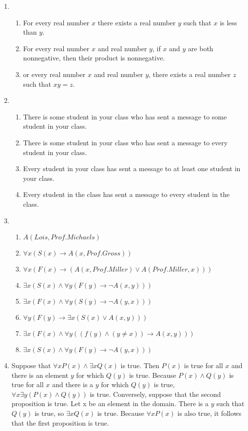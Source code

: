 \documentclass{../../cls/sig-alternate-05-2015}
\begin{document}
\begin{enumerate}
\item 
\begin{enumerate}
	\item For every real number $x$ there exists a real number $y$
	such that $x$ is less than $y$.
	\item For every real number $x$ and real
	number $y$, if $x$ and $y$ are both nonnegative, then their product
	is nonnegative.
	\item or every real number $x$ and real number
	$y$, there exists a real number $z$ such that $xy = z$.
\end{enumerate}

\item 
\begin{enumerate}
	\item There is some student in your class who has sent a message to
	some student in your class.
	\item There is some student in your
	class who has sent a message to every student in your class.
	\item Every student in your class has sent a message to at least
	one student in your class.
	\item Every student in the class
	has sent a message to every student in the class.
\end{enumerate}

\item 
\begin{enumerate}
	\item $A(Lois, Prof. Michaels)$
	\item $\forall x (S(x) \rightarrow A(x, Prof. Gross))$
	\item $\forall x (F(x) \rightarrow (A(x, Prof. Miller) \vee A(Prof. Miller, x)))$
	\item $\exists x (S(x) \wedge \forall y (F(y) \rightarrow \neg A(x, y)))$
	\item $\exists x (F(x) \wedge \forall y (S(y) \rightarrow \neg A(y, x)))$
	\item $\forall y (F(y) \rightarrow \exists x (S(x) \vee A(x, y)))$
	\item $\exists x (F(x) \wedge \forall y ((f(y) \wedge (y \ne x)) \rightarrow A(x, y)))$
	\item $\exists x (S(x) \wedge \forall y (F(y) \rightarrow \neg A(y, x)))$
\end{enumerate}
	
\item Suppose that $\forall x P(x) \wedge \exists x Q(x)$ is true. Then $P(x)$ is true for all $x$ and there is an element $y$ for which $Q(y)$ is true.
Because $P(x) \wedge Q(y)$ is true for all $x$ and there is a $y$ for which
$Q(y)$ is true, $\forall x \exists y (P(x) \wedge Q(y))$ is true. Conversely, suppose
that the second proposition is true. Let x be an element
in the domain. There is a $y$ such that $Q(y)$ is true, so $\exists x Q(x)$
is true. Because $\forall x P(x)$ is also true, it follows that the first
proposition is true.
	

\end{enumerate}
\end{document}
